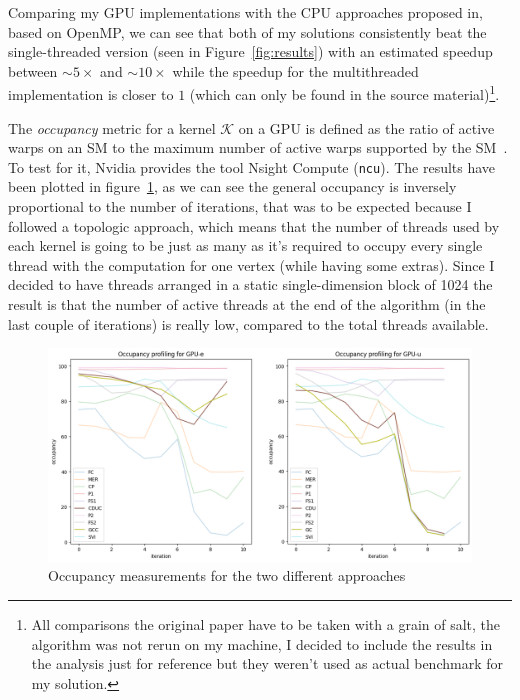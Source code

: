 \documentclass[a4paper,10pt]{article}
\begin{document}
Comparing my GPU implementations with the CPU approaches proposed in\cite{generic-he-boruvka}, based
on OpenMP, we can see that both of my solutions consistently beat the single-threaded version (seen
in Figure~\ref{fig:results}) with an estimated speedup between $\sim5\times$ and $\sim10\times$
while the speedup for the multithreaded implementation is closer to $1$ (which can only be found in
the source material)\footnote{All comparisons the original paper have to be taken with a grain of
salt, the algorithm was not rerun on my machine, I decided to include the results in the analysis
just for reference but they weren't used as actual benchmark for my solution.}.

\medskip
The \emph{occupancy} metric for a kernel $\mathcal{K}$ on a GPU is defined as the ratio of active
warps on an SM to the maximum number of active warps supported by the SM~\cite{def-occupancy}. To
test for it, Nvidia provides the tool Nsight Compute (\texttt{ncu}). The results have been plotted
in figure~\ref{fig:occupancy}, as we can see the general occupancy is inversely proportional to the
number of iterations, that was to be expected because I followed a topologic approach, which means
that the number of threads used by each kernel is going to be just as many as it's required to
occupy every single thread with the computation for one vertex (while having some extras). Since I
decided to have threads arranged in a static single-dimension block of 1024 the result is that the
number of active threads at the end of the algorithm (in the last couple of iterations) is really
low, compared to the total threads available.
\begin{figure}[!h]
	\centering
	\includegraphics[scale=0.5]{fig/occupancy.png}
	\caption{Occupancy measurements for the two different approaches}
	\label{fig:occupancy}
\end{figure}
\end{document}
